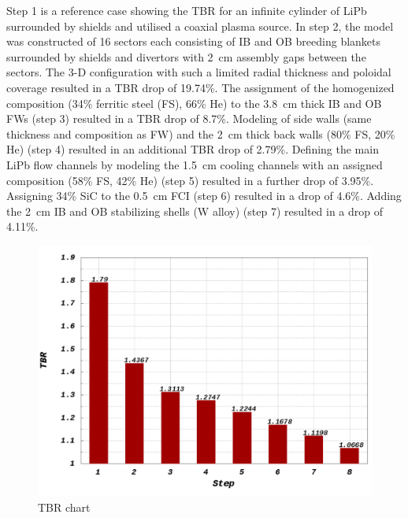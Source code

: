 \documentclass[12pt, letterpaper]{elsarticle}
\begin{document}
Step 1 is a reference case showing the TBR for an infinite cylinder of LiPb surrounded by shields and utilised a coaxial plasma source. In step 2, the model was constructed of 16 sectors each consisting of IB and OB breeding blankets surrounded by shields and divertors with \SI{2}{cm} assembly gaps between the sectors. The 3-D configuration with such a limited radial thickness and poloidal coverage resulted in a TBR drop of 19.74\%. The assignment of the homogenized composition (34\% ferritic steel (FS), 66\% He) to the \SI{3.8}{cm} thick IB and OB FWs (step 3) resulted in a TBR drop of 8.7\%. Modeling of side walls (same thickness and composition as FW) and the \SI{2}{cm} thick back walls (80\% FS, 20\% He) (step 4) resulted in an additional TBR drop of 2.79\%. Defining the main LiPb flow channels by modeling the \SI{1.5}{cm} cooling channels with an assigned composition (58\% FS, 42\% He) (step 5) resulted in a further drop of 3.95\%. Assigning 34\% SiC to the \SI{0.5}{cm} FCI (step 6) resulted in a drop of 4.6\%. Adding the \SI{2}{cm} IB and OB stabilizing shells (W alloy) (step 7) resulted in a drop of 4.11\%.
\begin{figure}[h!]
  \centering
  \includegraphics[scale=0.3]{../plots/TBR_chart.png}
  \caption{TBR chart}
  \label{fig:TBR chart}
\end{figure}
\end{document}

